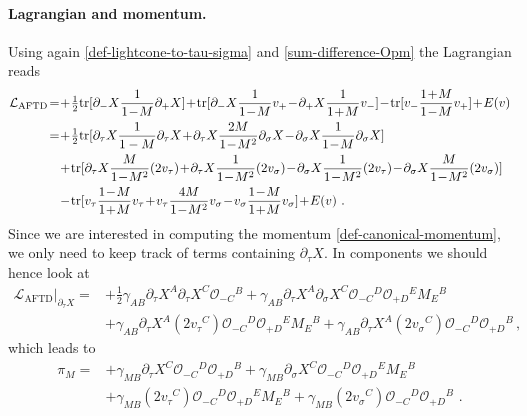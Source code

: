 \documentclass[12pt]{article}
\numberwithin{equation}{section}
\begin{document}
\paragraph{Lagrangian and momentum.} Using again \eqref{def-lightcone-to-tau-sigma} and \eqref{sum-difference-Opm} the Lagrangian reads
\begin{align}\label{AF-TD-Lagrangian}
\mathcal{L}_{\mathrm{AFTD}}\!=\!& +\!\tfrac{1}{2}\mathrm{tr}[\partial_{-}X\frac{1}{1\!-\!M} \partial_{+}X]\!+\!\mathrm{tr}[\partial_{-}X\frac{1}{1\!-\!M} v_{+} \!-\! \partial_{+}X\frac{1}{1\!+\!M} v_{-}] \!-\! \mathrm{tr}[v_{-}\frac{1\!+\!M}{1\!-\!M} v_{+}]\!+\!E(v)
\notag \\
\!=\!&+\!\tfrac{1}{2}\mathrm{tr}[\partial_{\tau}X\frac{1}{1-M} \partial_{\tau}X\!+\!\partial_{\tau}X\frac{2M}{1\!-\!M^2} \partial_{\sigma}X \!-\! \partial_{\sigma}X\frac{1}{1\!-\!M} \partial_{\sigma}X]
\notag\\
&+\!\mathrm{tr}[\partial_{\tau}X\frac{M}{1\!-\!M^2}(2v_{\tau})\!+\!\partial_{\tau}X\frac{1}{1\!-\!M^2}(2v_{\sigma})\!-\!\partial_{\sigma}X\frac{1}{1\!-\!M^2}(2v_{\tau})\!-\!\partial_{\sigma}X\frac{M}{1\!-\!M^2}(2v_{\sigma})]
\notag \\
&-\!\mathrm{tr}[v_{\tau}\frac{1\!-\!M}{1\!+\!M}v_{\tau}\!+\!v_{\tau}\frac{4M}{1\!-\!M^2}v_{\sigma}\!-\!v_{\sigma}\frac{1\!-\!M}{1\!+\!M}v_{\sigma}] \!+\! E(v) \,\, .
\end{align}
Since we are interested in computing the momentum \eqref{def-canonical-momentum}, we only need to keep track of terms containing $\partial_{\tau}X$. In components we should hence look at
\begin{equation}
\begin{aligned}
\!\!\!\!\!\!\mathcal{L}_{\mathrm{AFTD}}|_{\partial_{\tau}X}\!\!=\!&+\!\tfrac{1}{2}\gamma_{AB}\partial_{\tau}X^{A}\partial_{\tau}X^{C}\mathcal{O}_{-C}{}^{B} \!+\!\gamma_{AB}\partial_{\tau}X^{A}\partial_{\sigma}X^{C}\mathcal{O}_{-C}{}^{D}\mathcal{O}_{+D}{}^{E}M_{E}{}^{B}
\\
&+\!\gamma_{AB}\partial_{\tau}X^{A}(2v_{\tau}{}^{C})\mathcal{O}_{-C}{}^{D}\mathcal{O}_{+D}{}^{E}M_{E}{}^{B}\!+\!\gamma_{AB}\partial_{\tau}X^{A}(2v_{\sigma}{}^{C})\mathcal{O}_{-C}{}^{D}\mathcal{O}_{+D}{}^{B} \, ,
\end{aligned}
\end{equation}
which leads to
\begin{equation}
\begin{aligned}
\pi_{M}=&+\gamma_{MB}\partial_{\tau}X^{C}\mathcal{O}_{-C}{}^{D}\mathcal{O}_{+D}{}^{B}+\gamma_{MB}\partial_{\sigma}X^{C}\mathcal{O}_{-C}{}^{D}\mathcal{O}_{+D}{}^{E}M_{E}{}^{B}
\\
&+\gamma_{MB}(2v_{\tau}{}^{C})\mathcal{O}_{-C}{}^{D}\mathcal{O}_{+D}{}^{E}M_{E}{}^{B}+\gamma_{MB}(2v_{\sigma}{}^{C})\mathcal{O}_{-C}{}^{D}\mathcal{O}_{+D}{}^{B} \,\, .
\end{aligned}
\end{equation}
\end{document}
